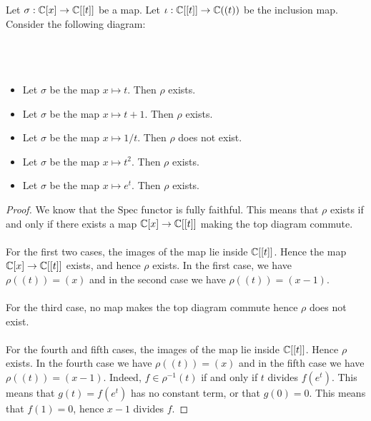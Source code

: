 \documentclass[a4paper]{article}
\begin{document}
\begin{eg}{}{} Let $\sigma:\mathbb{C}[x]\to\mathbb{C}[[t]]$ be a map. Let $\iota:\mathbb{C}[[t]]\to\mathbb{C}((t))$ be the inclusion map. Consider the following diagram: \\~\\
\\~\\
\begin{itemize}
\item Let $\sigma$ be the map $x\mapsto t$. Then $\rho$ exists. 
\item Let $\sigma$ be the map $x\mapsto t+1$. Then $\rho$ exists. 
\item Let $\sigma$ be the map $x\mapsto 1/t$. Then $\rho$ does not exist. 
\item Let $\sigma$ be the map $x\mapsto t^2$. Then $\rho$ exists. 
\item Let $\sigma$ be the map $x\mapsto e^t$. Then $\rho$ exists. 
\end{itemize} \tcbline
\begin{proof}
We know that the $\text{Spec}$ functor is fully faithful. This means that $\rho$ exists if and only if there exists a map $\mathbb{C}[x]\to\mathbb{C}[[t]]$ making the top diagram commute. \\~\\

For the first two cases, the images of the map lie inside $\mathbb{C}[[t]]$. Hence the map $\mathbb{C}[x]\to\mathbb{C}[[t]]$ exists, and hence $\rho$ exists. In the first case, we have $\rho((t))=(x)$ and in the second case we have $\rho((t))=(x-1)$. \\~\\

For the third case, no map makes the top diagram commute hence $\rho$ does not exist. \\~\\

For the fourth and fifth cases, the images of the map lie inside $\mathbb{C}[[t]]$. Hence $\rho$ exists. In the fourth case we have $\rho((t))=(x)$ and in the fifth case we have $\rho((t))=(x-1)$. Indeed, $f\in\rho^{-1}(t)$ if and only if $t$ divides $f(e^t)$. This means that $g(t)=f(e^t)$ has no constant term, or that $g(0)=0$. This means that $f(1)=0$, hence $x-1$ divides $f$. 
\end{proof}
\end{eg}
\end{document}

